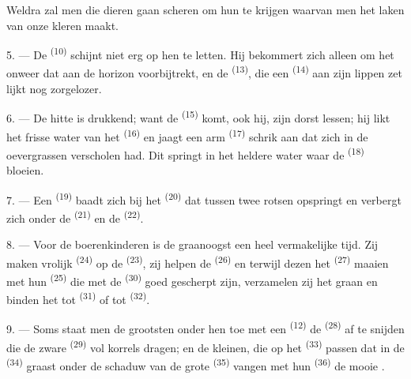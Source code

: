 Weldra zal men die dieren gaan scheren om hun  te krijgen waarvan men het laken
van onze kleren maakt.

\VUsaut{5.0mm}
\VUsaut{3.4mm}

5. --- De  \textsuperscript{(10)} schijnt niet erg op hen te letten. Hij
bekommert zich alleen om het onweer dat aan de horizon voorbijtrekt, en de
 \textsuperscript{(13)}, die een  \textsuperscript{(14)}
aan zijn lippen zet lijkt nog zorgelozer.

6. --- De hitte is drukkend; want de  \textsuperscript{(15)} komt, ook hij, zijn
dorst lessen; hij likt het frisse water van het  \textsuperscript{(16)} en
jaagt een arm  \textsuperscript{(17)} schrik aan dat zich in de oevergrassen
verscholen had. Dit springt in het heldere water waar de 
\textsuperscript{(18)} bloeien.

7. --- Een  \textsuperscript{(19)} baadt zich bij het
 \textsuperscript{(20)} dat tussen twee rotsen opspringt en
verbergt zich onder de  \textsuperscript{(21)} en de
 \textsuperscript{(22)}.

\VUsaut{5.0mm}
\VUsaut{3.4mm}

8. --- Voor de boerenkinderen is de graanoogst een heel vermakelijke tijd. Zij maken vrolijk
 \textsuperscript{(24)} op de
 \textsuperscript{(23)}, zij helpen de 
\textsuperscript{(26)} en terwijl dezen het  \textsuperscript{(27)} maaien
met hun  \textsuperscript{(25)} die met de 
\textsuperscript{(30)} goed gescherpt zijn, verzamelen zij het graan en binden het tot
 \textsuperscript{(31)} of tot
 \textsuperscript{(32)}.

9. --- Soms staat men de grootsten onder hen toe met een 
\textsuperscript{(12)} de  \textsuperscript{(28)} af te snijden die de
zware  \textsuperscript{(29)} vol korrels dragen; en de kleinen, die op het
 \textsuperscript{(33)} passen dat in de
 \textsuperscript{(34)} graast onder de schaduw van de grote
 \textsuperscript{(35)} vangen met hun 
\textsuperscript{(36)} de mooie .

